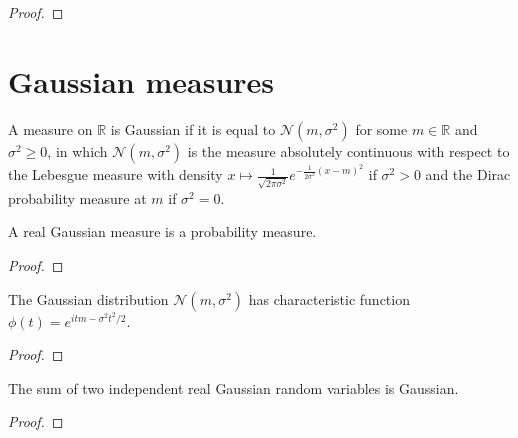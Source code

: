 \begin{proof}

\end{proof}

\chapter{Gaussian measures}

\begin{definition}\label{def:gaussianReal}
\mathlibok
{}
A measure on $\mathbb{R}$ is Gaussian if it is equal to $\mathcal{N}(m, \sigma^2)$ for some $m \in \mathbb{R}$ and $\sigma^2 \ge 0$, in which $\mathcal{N}(m, \sigma^2)$ is the measure absolutely continuous with respect to the Lebesgue measure with density $x \mapsto \frac{1}{\sqrt{2 \pi \sigma^2}}e^{- \frac{1}{2\sigma^2}(x - m)^2}$ if $\sigma^2>0$ and the Dirac probability measure at $m$ if $\sigma^2 = 0$.
\end{definition}


\begin{lemma}\label{lem:isProbabilityMeasure_gaussianReal}
\mathlibok
{}
A real Gaussian measure is a probability measure.
\end{lemma}

\begin{proof}\leanok
\end{proof}


\begin{lemma}\label{lem:gaussian_charFun}
\mathlibok
{}
The Gaussian distribution $\mathcal N(m, \sigma^2)$ has characteristic function $\phi(t) = e^{itm - \sigma^2 t^2 /2}$.
\end{lemma}

\begin{proof}\leanok
\end{proof}


\begin{lemma}\label{lem:add_gaussianReal}
\mathlibok
{}
The sum of two independent real Gaussian random variables is Gaussian.
\end{lemma}

\begin{proof}\leanok
{}

\end{proof}


